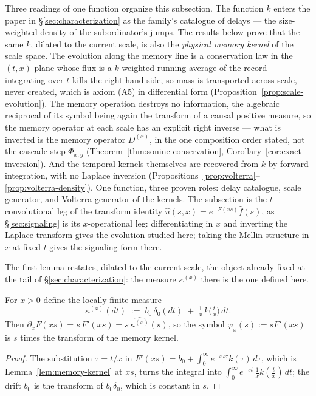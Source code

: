 Three readings of one function organize this subsection. The function $k$ enters the paper
in \S\ref{sec:characterization} as the family's catalogue of delays --- the size-weighted
density of the subordinator's jumps. The results below prove that the same $k$, dilated to
the current scale, is also the \emph{physical memory kernel} of the scale space. The
evolution along the memory line is a conservation law in the $(t,x)$-plane whose flux is a
$k$-weighted running average of the record --- integrating over $t$ kills the right-hand
side, so mass is transported across scale, never created, which is axiom (A5) in
differential form (Proposition~\ref{prop:scale-evolution}). The memory operation destroys
no information, the algebraic reciprocal of its symbol being again the transform of a
causal positive measure, so the memory operator at each scale has an explicit right inverse
--- what is inverted is the memory operator $D^{(x)}$, in the one composition order stated,
not the cascade step $\Phi_{x,y}$ (Theorem~\ref{thm:sonine-conservation},
Corollary~\ref{cor:exact-inversion}). And the temporal kernels themselves are recovered
from $k$ by forward integration, with no Laplace inversion
(Propositions~\ref{prop:volterra}--\ref{prop:volterra-density}). One function, three proven
roles: delay catalogue, scale generator, and Volterra generator of the kernels. The
subsection is the $t$-convolutional leg of the transform identity
$\hat u(s, x) = e^{-F(xs)}\hat f(s)$, as \S\ref{sec:signaling} is its $x$-operational leg:
differentiating in $x$ and inverting the Laplace transform gives the evolution studied
here; taking the Mellin structure in $x$ at fixed $t$ gives the signaling form there.

The first lemma restates, dilated to the current scale, the object already fixed at the tail
of \S\ref{sec:characterization}: the measure $\kappa^{(x)}$ there is the one defined here.

\begin{lemma}\label{lem:memory-kernel-transform}
For $x > 0$ define the locally finite measure
\[
  \kappa^{(x)}(dt) \;:=\; b_0\,\delta_0(dt) \;+\; \tfrac{1}{x}\,k\bigl(\tfrac{t}{x}\bigr)\,dt .
\]
Then $\partial_x F(xs) = s\,F'(xs) = s\,\widehat{\kappa^{(x)}}(s)$, so the symbol
$\varphi_x(s) := s F'(xs)$ is $s$ times the transform of the memory kernel.
\end{lemma}

\begin{proof}
The substitution $\tau = t/x$ in $F'(xs) = b_0 + \int_0^\infty e^{-xs\tau} k(\tau)\,d\tau$,
which is Lemma~\ref{lem:memory-kernel} at $xs$, turns the integral into
$\int_0^\infty e^{-st}\,\tfrac{1}{x}k(\tfrac{t}{x})\,dt$; the drift $b_0$ is the transform of
$b_0\delta_0$, which is constant in $s$.
\end{proof}

